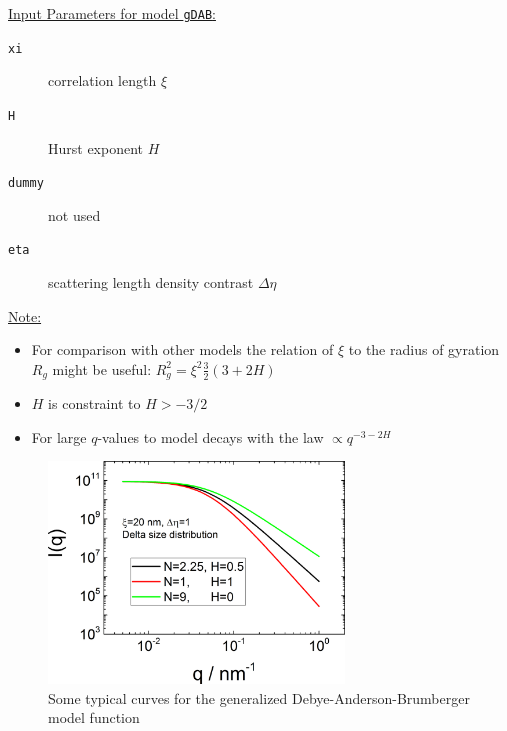 \uline{Input Parameters for model \texttt{gDAB}:}\\
\begin{description}
\item[\texttt{xi}] correlation length $\xi$
\item[\texttt{H}] Hurst exponent $H$
\item[\texttt{dummy}] not used
\item[\texttt{eta}] scattering length density contrast $\Delta\eta$
\end{description}

\uline{Note:}
\begin{itemize}
\item For comparison with other models the relation of $\xi$ to the radius of gyration $R_g$ might be useful: $R_g^2=\xi^2 \frac32 (3+2H)$
\item $H$ is constraint to $H>-3/2$
\item For large $q$-values to model decays with the law $\propto q^{-3-2H}$
\end{itemize}


\begin{figure}[htb]
\begin{center}
\includegraphics[width=0.7\textwidth]{../images/form_factor/nonparticular/gDAB.png}
\end{center}
\caption{Some typical curves for the generalized Debye-Anderson-Brumberger model function} \label{fig:gDABIq}
\end{figure}


\clearpage
